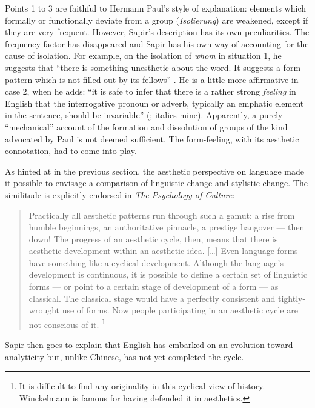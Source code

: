 \documentclass[output=paper]{langscibook}
\begin{document}
Points 1 to 3 are faithful to Hermann Paul's style of explanation: elements which formally or functionally deviate from a group (\emph{Isolierung}) are weakened, except if they are very frequent. However, Sapir's description has its own peculiarities. The frequency factor has disappeared and Sapir has his own way of accounting for the cause of isolation. For example, on the isolation of \emph{whom} in situation 1, he suggests that ``there is something unesthetic about the word. It suggests a form pattern which is not filled out by its fellows'' \citep[158]{Sapir1921}. He is a little more affirmative in case 2, when he adds: ``it is safe to infer that there is a rather strong \emph{feeling} in English that the interrogative pronoun or adverb, typically an emphatic element in the sentence, should be invariable'' (\citealt[159]{Sapir1921}; italics mine). Apparently, a purely ``mechanical'' account of the formation and dissolution of groups of the kind advocated by Paul is not deemed sufficient. The form-feeling, with its aesthetic connotation, had to come into play.

As hinted at in the previous section, the aesthetic perspective on language made it possible to envisage a comparison of linguistic change and stylistic change. The similitude is explicitly endorsed in \emph{The Psychology of Culture}:

\begin{quotation}
Practically all aesthetic patterns run through such a gamut: a rise from humble beginnings, an authoritative pinnacle, a prestige hangover — then down! The progress of an aesthetic cycle, then, means that there is aesthetic development within an aesthetic idea. […] Even language forms have something like a cyclical development. Although the language's development is continuous, it is possible to define a certain set of linguistic forms — or point to a certain stage of development of a form — as classical. The classical stage would have a perfectly consistent and tightly-wrought use of forms. Now people participating in an aesthetic cycle are not conscious of it. \citep[132--133]{Sapir2002}\footnote{It is difficult to find any originality in this cyclical view of history. Winckelmann is famous for having defended it in aesthetics.} 
\end{quotation}

Sapir then goes to explain that English has embarked on an evolution toward analyticity but, unlike Chinese, has not yet completed the cycle.
\end{document}
